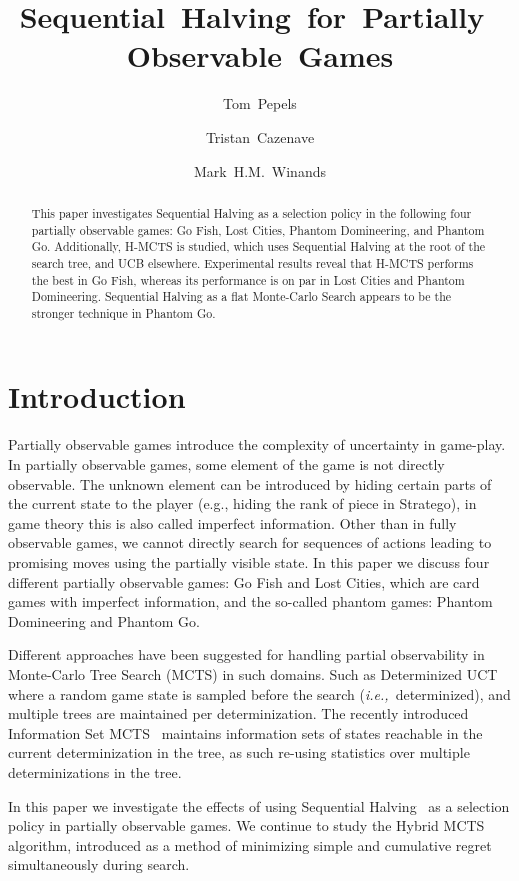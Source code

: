\documentclass[a4paper]{llncs}
\title{Sequential~Halving~for~Partially~Observable~Games}
\author{Tom~Pepels\inst{1} \and Tristan~Cazenave\inst{2} \and Mark~H.M.~Winands\inst{1}}
\institute{Department of Knowledge Engineering,  Maastricht University\\ \email{\{tom.pepels,m.winands\}@maastrichtuniversity.nl} \and LAMSADE - Université Paris-Dauphine \\ \email{cazenave@lamsade.dauphine.fr}}
\newcommand{\ie}{{\it i.e.,}~}
\begin{document}
\maketitle

\begin{abstract} 
This paper investigates Sequential Halving as a selection policy in the following four partially observable games: Go Fish, Lost Cities, Phantom Domineering, and Phantom Go. Additionally, H-MCTS is studied, which uses Sequential Halving at  the root of the search tree, and UCB elsewhere. Experimental results reveal that H-MCTS performs the best in Go Fish, whereas its performance is on par in Lost Cities and Phantom Domineering. Sequential Halving as a flat Monte-Carlo Search appears to be the stronger technique in Phantom Go. 
\end{abstract}

\section{Introduction}
\label{sec:intro}

Partially observable games introduce the complexity of uncertainty in game-play. In partially observable games, some element of the game is not directly observable. The unknown element can be introduced by hiding certain parts of the current state to the player (e.g., hiding the rank of piece in Stratego), in game theory this is also called imperfect information. Other than in fully observable games, we cannot directly search for sequences of actions leading to promising moves using the partially visible state. In this paper we discuss four different partially observable games: Go Fish and Lost Cities, which are card games with imperfect information, and the so-called phantom games: Phantom Domineering and Phantom Go.

Different approaches have been suggested for handling partial observability in Monte-Carlo Tree Search (MCTS) in such domains. Such as Determinized UCT~\cite{cowling2012} where a random game state is sampled before the search (\ie determinized), and multiple trees are maintained per determinization. The recently introduced Information Set MCTS~\cite{cowling2012} maintains information sets of states reachable in the current determinization in the tree, as such re-using statistics over multiple determinizations in the tree.

In this paper we investigate the effects of using Sequential Halving~\cite{Karnin13SH} as a selection policy in partially observable games. We continue to study the Hybrid MCTS~\cite{Pepels14hmcts} algorithm, introduced as a method of minimizing simple and cumulative regret simultaneously during search.
\end{document}
